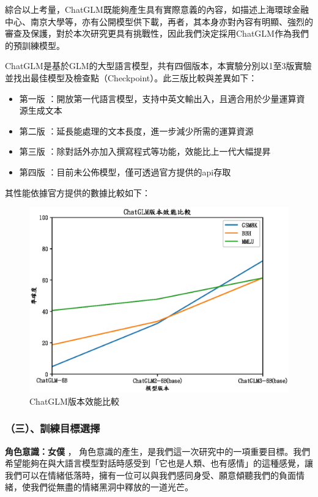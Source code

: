 \documentclass[12pt,a4paper,MingLiU,UTF8,natbib]{article}
\def\xeCJKembold{0.4}
\def\saveCJKnode{\dimen255\lastkern}
\def\restoreCJKnode{\kern-\dimen255\kern\dimen255}
\let\CJKoldsymbol\CJKsymbol
\let\CJKoldpunctsymbol\CJKpunctsymbol
\def\CJKfakeboldsymbol#1{%
	\special{pdf:literal direct 2 Tr \xeCJKembold\space w}%
	\CJKoldsymbol{#1}%
	\saveCJKnode
	\special{pdf:literal direct 0 Tr}%
	\restoreCJKnode}
\def\CJKfakeboldpunctsymbol#1{%
	\special{pdf:literal direct 2 Tr \xeCJKembold\space w}%
	\CJKoldpunctsymbol{#1}%
	\saveCJKnode
	\special{pdf:literal direct 0 Tr}%
	\restoreCJKnode}
\newcommand\CJKfakebold[1]{%
	\let\CJKsymbol\CJKfakeboldsymbol
	\let\CJKpunctsymbol\CJKfakeboldpunctsymbol
	#1%
	\let\CJKsymbol\CJKoldsymbol
	\let\CJKpunctsymbol\CJKoldpunctsymbol}
\begin{document}
	綜合以上考量，ChatGLM既能夠產生具有實際意義的內容，如描述上海環球金融中心、南京大學等，亦有公開模型供下載，再者，其本身亦對內容有明顯、強烈的審查及保護，對於本次研究更具有挑戰性，因此我們決定採用ChatGLM作為我們的預訓練模型。


	ChatGLM是基於GLM的大型語言模型，共有四個版本，本實驗分別以1至3版實驗並找出最佳模型及檢查點（Checkpoint）。此三版比較與差異如下：
	\begin{itemize}
		\item \CJKfakebold{第一版}：開放第一代語言模型，支持中英文輸出入，且適合用於少量運算資源生成文本
		\item \CJKfakebold{第二版}：延長能處理的文本長度，進一步減少所需的運算資源
		\item \CJKfakebold{第三版}：除對話外亦加入撰寫程式等功能，效能比上一代大幅提昇
		\item \CJKfakebold{第四版}：目前未公佈模型，僅可透過官方提供的api存取
	\end{itemize}
	其性能依據官方提供的數據比較如下：
	
	\begin{figure}[H]
		\centering
	\includegraphics[scale=0.7]{chatglmversion}
		\caption{ChatGLM版本效能比較}
	\end{figure}
	
	\subsubsection{（三）、訓練目標選擇}
	\CJKfakebold{\textbf{角色意識：女僕}}，	角色意識的產生，是我們這一次研究中的一項重要目標。我們希望能夠在與大語言模型對話時感受到「它也是人類、也有感情」的這種感覺，讓我們可以在情緒低落時，擁有一位可以與我們感同身受、願意傾聽我們的負面情緒，使我們從無盡的情緒黑洞中釋放的一道光芒。
 
\end{document}
